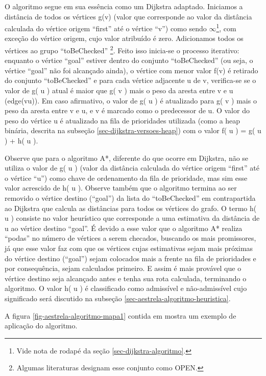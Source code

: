 O algoritmo segue em sua essência como um Dijkstra adaptado. Iniciamos a distância de todos os vértices g(v) (valor que corresponde ao valor da distância calculada do vértice origem ``first'' até o vértice ``v'') como sendo $\infty$\footnote{Vide nota de rodapé da seção \ref{sec-dijkstra-algoritmo}.}, com exceção do vértice origem, cujo valor atribuído é zero. Adicionamos todos os vértices ao grupo ``toBeChecked'' \footnote{Algumas literaturas designam esse conjunto como OPEN.}. Feito isso inicia-se o processo iterativo: enquanto o vértice ``goal'' estiver dentro do conjunto ``toBeChecked'' (ou seja, o vértice ``goal'' não foi alcançado ainda), o vértice com menor valor f(v) é retirado do conjunto ``toBeChecked'' e para cada vértice adjacente u de v, verifica-se se o valor de g( u ) atual é maior que g( v ) mais o peso da aresta entre v e u (edge(vu)). Em caso afirmativo, o valor de g( u ) é atualizado para g( v ) mais o peso da aresta entre v e u, e v é marcado como o predecessor de u. O valor do peso do vértice u é atualizado na fila de prioridades utilizada (como a heap binária, descrita na subseção \ref{sec-dijkstra-versoes-heap}) com o valor f( u ) = g( u ) + h( u ).

Observe que para o algoritmo A*, diferente do que ocorre em Dijkstra, não se utiliza o valor de g( u ) (valor da distância calculada do vértice origem ``first'' até o vértice ``u'') como chave de ordenamento da fila de prioridade, mas sim esse valor acrescido de h( u ). Observe também que o algoritmo termina ao ser removido o vértice destino (``goal'') da lista do ``toBeChecked'' em contrapartida ao Dijkstra que calcula as distâncias para todos os vértices do grafo. O termo h( u ) consiste no valor heurístico que corresponde a uma estimativa da distância de u ao vértice destino ``goal''. É devido a esse valor que o algoritmo A* realiza ``podas'' no número de vértices a serem checados, buscando os mais promissores, já que esse valor faz com que os vértices cujas estimativas sejam mais próximas do vértice destino (``goal'') sejam colocados mais a frente na fila de prioridades e por consequência, sejam calculados primeiro. E assim é mais provável que o vértice destino seja alcançado antes e tenha sua rota calculada, terminando o algoritmo. O valor h( u ) é classificado como admissível e não-admissível cujo significado será discutido na subseção \ref{sec-aestrela-algoritmo-heuristica}.

A figura \ref{fig-aestrela-algoritmo-mapa1} contida em  mostra um exemplo de aplicação do algoritmo.

